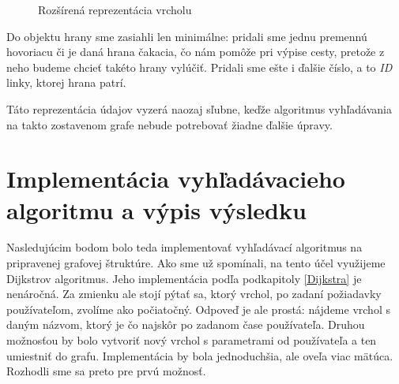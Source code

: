 \begin{figure}[H]
\caption{Rozšírená reprezentácia vrcholu}
\label{2_Vertex}
\end{figure}

Do objektu hrany sme zasiahli len minimálne: pridali sme jednu premennú hovoriacu či je daná hrana čakacia, čo nám pomôže pri výpise cesty, pretože z neho budeme chcieť takéto hrany vylúčiť. Pridali sme ešte i ďalšie číslo, a to \textit{ID} linky, ktorej hrana patrí.\newline

Táto reprezentácia údajov vyzerá naozaj sľubne, keďže algoritmus vyhľadávania na takto zostavenom grafe nebude potrebovať žiadne ďalšie úpravy.\newline


\section{Implementácia vyhľadávacieho algoritmu a výpis výsledku}

Nasledujúcim bodom bolo teda implementovať vyhľadávací algoritmus na pripravenej grafovej štruktúre. Ako sme už spomínali, na tento účel využijeme Dijkstrov algoritmus. Jeho implementácia podľa podkapitoly \ref{Dijkstra} je nenáročná. Za zmienku ale stojí pýtať sa, ktorý vrchol, po zadaní požiadavky používateľom, zvolíme ako počiatočný. Odpoveď je ale prostá: nájdeme vrchol s daným názvom, ktorý je čo najskôr po zadanom čase používateľa. Druhou možnosťou by bolo vytvoriť nový vrchol s parametrami od používateľa a ten umiestniť do grafu. Implementácia by bola jednoduchšia, ale oveľa viac mätúca. Rozhodli sme sa preto pre prvú možnosť.\newline

